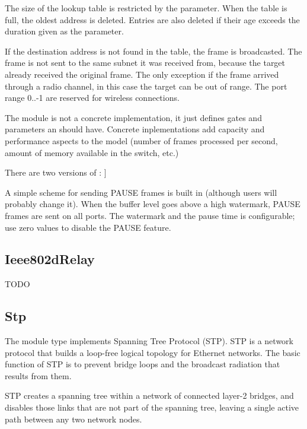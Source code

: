
The size of the lookup table is restricted by the  parameter.
When the table is full, the oldest address is deleted. Entries are also deleted
if their age exceeds the duration given as the  parameter.

If the destination address is not found in the table, the frame is broadcasted.
The frame is not sent to the same subnet it was received from, because the
target already received the original frame. The only exception if the frame
arrived through a radio channel, in this case the target can be out of range.
The port range 0..-1 are reserved for wireless connections.

The  module is not a concrete implementation,
it just defines gates and parameters an  should have.
Concrete inplementations add
capacity and performance aspects to the model (number of frames processed
per second, amount of memory available in the switch, etc.)

There are two versions of : ]

A simple scheme for sending PAUSE frames is built in (although
users will probably change it). When the buffer level goes
above a high watermark, PAUSE frames are sent on all ports.
The watermark and the pause time is configurable; use zero
values to disable the PAUSE feature.

\subsection{Ieee802dRelay}

 TODO

\subsection{Stp}

The  module type implements Spanning Tree Protocol (STP). STP
is a network protocol that builds a loop-free logical topology for Ethernet
networks. The basic function of STP is to prevent bridge loops and the broadcast
radiation that results from them.

STP creates a spanning tree within a network of connected layer-2 bridges, and
disables those links that are not part of the spanning tree, leaving a single
active path between any two network nodes.


